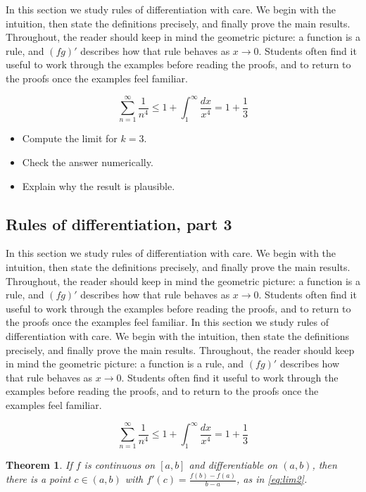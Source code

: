 \documentclass[11pt]{article}
\newtheorem{theorem}{Theorem}[section]
\begin{document}
In this section we study rules of differentiation with care. We begin with the intuition, then state the definitions precisely, and finally prove the main results. Throughout, the reader should keep in mind the geometric picture: a function is a rule, and $(fg)'$ describes how that rule behaves as $x \to 0$. Students often find it useful to work through the examples before reading the proofs, and to return to the proofs once the examples feel familiar. 

\[
  \sum_{n=1}^{\infty} \frac{1}{n^{4}} \le 1 + \int_1^{\infty} \frac{dx}{x^{4}} = 1 + \frac{1}{3}
\]

\begin{itemize}
  \item Compute the limit for $k = 3$.
  \item Check the answer numerically.
  \item Explain why the result is plausible.
\end{itemize}

\subsection{Rules of differentiation, part 3}

In this section we study rules of differentiation with care. We begin with the intuition, then state the definitions precisely, and finally prove the main results. Throughout, the reader should keep in mind the geometric picture: a function is a rule, and $(fg)'$ describes how that rule behaves as $x \to 0$. Students often find it useful to work through the examples before reading the proofs, and to return to the proofs once the examples feel familiar. In this section we study rules of differentiation with care. We begin with the intuition, then state the definitions precisely, and finally prove the main results. Throughout, the reader should keep in mind the geometric picture: a function is a rule, and $(fg)'$ describes how that rule behaves as $x \to 0$. Students often find it useful to work through the examples before reading the proofs, and to return to the proofs once the examples feel familiar. 

\[
  \sum_{n=1}^{\infty} \frac{1}{n^{4}} \le 1 + \int_1^{\infty} \frac{dx}{x^{4}} = 1 + \frac{1}{3}
\]

\begin{theorem}
If $f$ is continuous on $[a,b]$ and differentiable on $(a,b)$, then there is a point $c \in (a,b)$ with $f'(c) = \frac{f(b)-f(a)}{b-a}$, as in \eqref{eq:lim2}.
\end{theorem}
\end{document}
